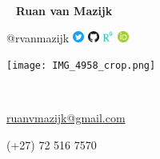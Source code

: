 \begin{multicols}{3}
  \
  \vfill
  \raggedleft
    {\Large \textbf{Ruan van Mazijk}} \par
    {\large @rvanmazijk}
    \href{https://twitter.com/rvanmazijk}
         {\includegraphics[width=1em]{logos/Twitter.png}}
    \href{https://github.com/rvanmazijk}
         {\includegraphics[width=1em]{logos/GitHub.png}}
    \href{https://www.researchgate.net/profile/Ruan-Van-Mazijk}
         {\includegraphics[width=1em]{logos/ResearchGate-white_crop.jpg}}
    \href{https://orcid.org/0000-0003-2659-6909}
         {\includegraphics[width=1em]{logos/ORCID.png}}
  \vfill
  \
  
  \columnbreak
  \begin{center}
    \texttt{[image: IMG\_4958\_crop.png]}
  \end{center}
  \columnbreak
  \par
  
  \
  \vfill
  \raggedright
    {\large \href{mailto:ruanvmazijk@gmail.com}{ruanvmazijk@gmail.com}} \par
    (+27) 72 516 7570
  \vfill
  \
\end{multicols}

